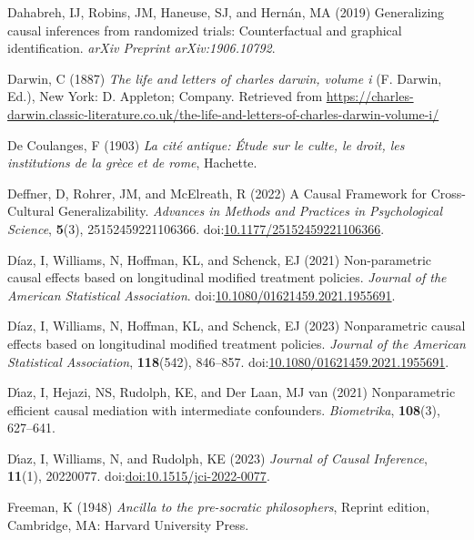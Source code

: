 \documentclass[
  single column]{article}
\newlength{\cslhangindent}
\newenvironment{CSLReferences}[2] %
 {\begin{list}{}{%
  \setlength{\itemindent}{0pt}
  \setlength{\leftmargin}{0pt}
  \setlength{\parsep}{0pt}
  \ifodd #1
   \setlength{\leftmargin}{\cslhangindent}
   \setlength{\itemindent}{-1\cslhangindent}
  \fi
  \setlength{\itemsep}{#2\baselineskip}}}
 {\end{list}}
\begin{document}
\begin{CSLReferences}{1}{0}
Dahabreh, IJ, Robins, JM, Haneuse, SJ, and Hernán, MA (2019)
Generalizing causal inferences from randomized trials: Counterfactual
and graphical identification. \emph{arXiv Preprint arXiv:1906.10792}.

Darwin, C (1887) \emph{The life and letters of charles darwin, volume i}
(F. Darwin, Ed.), New York: D. Appleton; Company. Retrieved from
\url{https://charles-darwin.classic-literature.co.uk/the-life-and-letters-of-charles-darwin-volume-i/}

De Coulanges, F (1903) \emph{La cité antique: Étude sur le culte, le
droit, les institutions de la grèce et de rome}, Hachette.

Deffner, D, Rohrer, JM, and McElreath, R (2022) A Causal Framework for
Cross-Cultural Generalizability. \emph{Advances in Methods and Practices
in Psychological Science}, \textbf{5}(3), 25152459221106366.
doi:\href{https://doi.org/10.1177/25152459221106366}{10.1177/25152459221106366}.

Díaz, I, Williams, N, Hoffman, KL, and Schenck, EJ (2021) Non-parametric
causal effects based on longitudinal modified treatment policies.
\emph{Journal of the American Statistical Association}.
doi:\href{https://doi.org/10.1080/01621459.2021.1955691}{10.1080/01621459.2021.1955691}.

Díaz, I, Williams, N, Hoffman, KL, and Schenck, EJ (2023) Nonparametric
causal effects based on longitudinal modified treatment policies.
\emph{Journal of the American Statistical Association},
\textbf{118}(542), 846--857.
doi:\href{https://doi.org/10.1080/01621459.2021.1955691}{10.1080/01621459.2021.1955691}.

Dı́az, I, Hejazi, NS, Rudolph, KE, and Der Laan, MJ van (2021)
Nonparametric efficient causal mediation with intermediate confounders.
\emph{Biometrika}, \textbf{108}(3), 627--641.

Dı́az, I, Williams, N, and Rudolph, KE (2023) \emph{Journal of Causal
Inference}, \textbf{11}(1), 20220077.
doi:\href{https://doi.org/doi:10.1515/jci-2022-0077}{doi:10.1515/jci-2022-0077}.

Freeman, K (1948) \emph{Ancilla to the pre-socratic philosophers},
Reprint edition, Cambridge, MA: Harvard University Press.


\end{CSLReferences}
\end{document}
